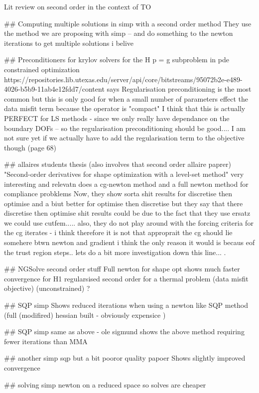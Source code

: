 Lit review on second order in the context of TO 

## Computing multiple solutions in simp with a second order method
\cite{Papadopoulos2021} 
They use the method we are proposing with simp -- and do something to the newton iterations to get multiple solutions i belive 

## Preconditioners for krylov solvers for the H p = g subproblem in pde constrained optimization 
https://repositories.lib.utexas.edu/server/api/core/bitstreams/95072b2e-e489-4026-b5b9-11ab4e12fdd7/content
says Regularisation preconditioning is the most common
but this is only good for when a small number of parameters effect the data misfit term because the operator is "compact" 
I think that this is actually PERFECT for LS methods - since we only really have dependance on the boundary DOFs -- so the regularisation preconditioning should be good....
I am not sure yet if we actually have to add the regularisation term to the objective though
(page 68)

## allaires students thesis (also involves that second order allaire paprer)
"Second-order derivatives for shape optimization with a level-set method"
\cite{vie2016second}
very interesting and relevatn
does a cg-newton method and a full newton method for compliance probklems 
Now, they show sorta shit results for discretise then optimise and a biut better for optimise then discretise 
but they say that there discretise then optimise shit results could be due to the fact that they use ersatz 
we could use cutfem..... 
also, they do not play around with the forcing criteria for the cg iterates - i think therefore it is not that approprait
the cg should lie somehere btwn newton and gradient
i think the only reason it would is becaus eof the trust region steps.. 
lets do a bit more investigation down this line... .

## NGSolve second order stuff 
Full newton for shape opt 
\cite{Gangl2020}
shows much faster convergence for H1 regularsised second order for a thermal problem (data misfit objective)
(unconstrained) ? 

## SQP simp 
\cite{RojasLabanda2016}
Shows reduced iterations when using a newton like SQP method (full (modifired) hessian built - obviously expensice )

## SQP simp same as above - ole sigmund
\cite{RojasLabanda2017}
shows the above method requiring fewer iterations than MMA 

## another simp sqp but a bit pooror quality papoer 
\cite{Liao2022}
Shows slightly improved convergence 

## solving simp newton on a reduced space so solves are cheaper 
\cite{Evgrafov2014}
